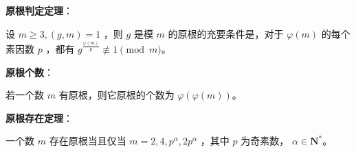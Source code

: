 \begin{tcolorbox}
\textbf{原根判定定理}：

设 $m \ge 3, (g,m)=1$ ，则 $g$ 是模 $m$ 的原根的充要条件是，对于 $\varphi(m)$ 的每个素因数 $p$ ，都有
$g^{\frac{\varphi(m)}{p}}\not\equiv 1\pmod m$。
\end{tcolorbox}


\begin{tcolorbox}
\textbf{原根个数}：

若一个数 $m$ 有原根，则它原根的个数为 $\varphi(\varphi(m))$。
\end{tcolorbox}


\begin{tcolorbox}
\textbf{原根存在定理}：

一个数 $m$ 存在原根当且仅当 $m=2,4,p^{\alpha},2p^{\alpha}$ ，其中 $p$ 为奇素数， $\alpha\in \mathbf{N}^{*}$。
\end{tcolorbox}